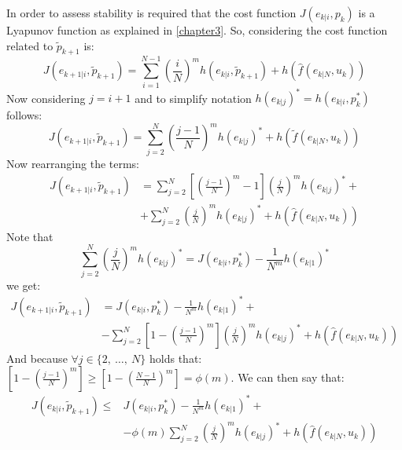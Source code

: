 
In order to assess stability is required that the cost function $J({e}_{k|i},{p}_k)$ is a Lyapunov function as explained in \ref{chapter3}. So, considering the cost function related to $\tilde{p}_{k+1}$ is:
\begin{equation*}
    J({e}_{k+1|i},\tilde{p}_{k+1})=\sum_{i=1}^{N-1}\left(\frac{i}{N}\right)^m h({e}_{k|i},\tilde{p}_{k+1})+h(\hat{f}(e_{k|N},u_k))
\end{equation*}
Now considering $j=i+1$ and to simplify notation $h(e_{k|j})^*=h({e}_{k|i},p_{k}^*)$ follows: 
\begin{equation*}
    J({e}_{k+1|i},\tilde{p}_{k+1})=\sum_{j=2}^{N}\left(\frac{j-1}{N}\right)^m h(e_{k|j})^*+h(\tilde{f}(e_{k|N},u_k))
\end{equation*}
Now rearranging the terms: 
\begin{equation*}
    \begin{split}
        J({e}_{k+1|i},\tilde{p}_{k+1})&=\sum_{j=2}^{N}\left[\left(\frac{j-1}{N}\right)^m-1\right]\left(\frac{j}{N}\right)^m h(e_{k|j})^*+ \\
        &+\sum_{j=2}^{N}\left(\frac{j}{N}\right)^m h(e_{k|j})^* + h(\hat{f}(e_{k|N},u_k))
    \end{split}
\end{equation*}
Note that 
\begin{equation*}
	\sum_{j=2}^{N}\left(\frac{j}{N}\right)^m h(e_{k|j})^*=J({e}_{k|i},p_{k}^*)-\frac{1}{N^m}h(e_{k|1})^*
\end{equation*}
we get:
\begin{equation*}
    \begin{split}
        J({e}_{k+1|i},\tilde{p}_{k+1})&=J({e}_{k|i},p_{k}^*)-\frac{1}{N^m}h(e_{k|1})^*+ \\ 
        &-\sum_{j=2}^{N}\left[1-\left(\frac{j-1}{N}\right)^m\right]\left(\frac{j}{N}\right)^m h(e_{k|j})^*+ h(\hat{f}(e_{k|N},u_k))
    \end{split}
\end{equation*}
And because $\forall j \in \lbrace2,\ \dots,\ N\rbrace$ holds that: 
$\left[ 1-\left(\frac{j-1}{N}\right)^m \right]\ge\left[ 1-\left(\frac{N-1}{N}\right)^m \right]= \phi(m)$. We can then say that: 
\begin{equation}\label{dim1}
    \begin{split}
        J({e}_{k|i},\tilde{p}_{k+1})\le &J({e}_{k|i},p_{k}^*) - \frac{1}{N^m}h(e_{k|1})^*+ \\ 
        &-\phi(m)\sum_{j=2}^{N}\left(\frac{j}{N}\right)^m h(e_{k|j})^*+ h(\hat{f}(e_{k|N},u_k))
    \end{split}
\end{equation}
